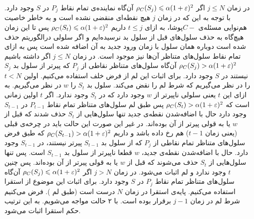 در زمان $j \le N$  اگر
$\rho_C(S_j) \leqslant \alpha (1+\varepsilon)^2 $ 
آن‌گاه نماینده‌ی تمام نقاط $P_j$ در $S$ وجود دارد.
با توجه به این که در زمان $j$ هیچ نقطه‌ای منقضی نشده است و به خاطر خاصیت هم‌نوایی مسئله‌ی $C-$پوشا، به ازای $ t \le j$ داریم 
$\rho_C(S_t) \leqslant \alpha (1+\varepsilon)^2 $ 
پس تا این زمان هیچ‌گاه به حذف سلول‌های قبل از سلول بد نرسیده‌ایم و اگر سلولی درالگوریتم حذف شده است دوباره همان سلول با زمان ورود جدید به آن اضافه شده است پس به ازای تمام نقاط سلول‌های متناظر آن‌ها نیز موجود است.
در زمان $j \le N$ اگر داشته باشیم
$\rho_C(S_j) > \alpha (1+\varepsilon)^2 $
آن‌گاه سلول‌های متناظر نقاطی از $P_j$ که پیرتر از سلول بد $S_j$ نیستند در $S$ وجود دارد.
برای اثبات این لم از فرض خلف استفاده می‌کنیم. اولین $t < N$ را در نظر می‌گیریم که شرط لم را نقض می‌کند. سلول بد $S_t$ را $w$ در نظر می‌گیریم. به ازای این $t$ یعنی سلولی ناپیرتر از $w$ وجود دارد که در $S_t$ وجود ندارد. اگر $t$ اولین زمانی است که 
$\rho_C(S_t) > \alpha (1+\varepsilon)^2 $
پس طبق لم  سلول‌های متناظر تمام نقاط $P_{t-1}$ در $S_{t-1}$ وجود دارد حال با اضافه‌شدن نقطه‌ی جدید تنها سلول‌هایی از $S_t$ حذف شدند که قبل از $w$ یا به قولی پیرتر از آن بوده‌اند. در غیر این صورت این حالت باید در چرخه‌ی قبلی (یعنی زمان $t-1$) هم رخ داده باشد و داریم
$\rho_C(S_{t-1}) > \alpha (1+\varepsilon)^2 $
که طبق فرض سلول‌های متناظر تمام نقاطی از $P_j$ که از سلول‌ بد $S_{t-1}$ پیرتر نیستند، در $S_{t-1}$ وجود دارد. حال با اضافه‌شدن نقطه‌ی جدید، $w$ قطعا ناپیرتر از سلول بد $S_{t-1}$ است. پس تنها سلول‌هایی از $S_t$ حذف می‌شوند که قبل از $w$ یا به قولی پیرتر از آن بوده‌اند. پس چنین $t$ وجود ندارد و لم اثبات می‌شود.
در زمان $j > N$  اگر
$\rho_C(S_j) \leqslant \alpha (1+\varepsilon)^2 $ 
آن‌گاه سلول‌های متناظر تمام نقاط $P_j$ در $S$ وجود دارد.
برای اثبات این موضوع از استقرا استفاده می‌کنیم. پایه‌‌ی استقرا در زمان $N$ درست است (طبق لم ). فرض می‌کنیم شرط لم در زمان $j-1$ برقرار بوده است. با ۲ حالت مواجه می‌شویم.
به این ترتیب حکم استقرا اثبات می‌شود.

